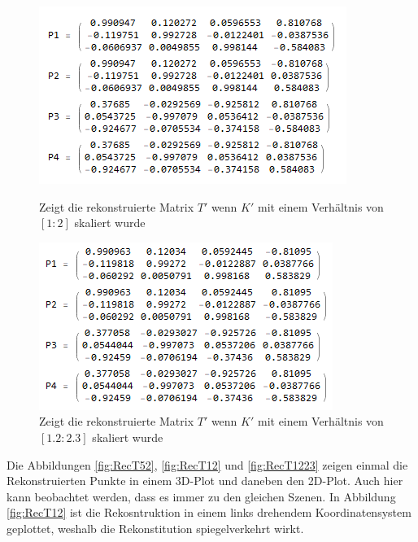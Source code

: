 \begin{figure}[!htb]
	\includegraphics[width=\linewidth]{images/R_12.png}
	\caption[Vier Lösungen für $T$ bei $K'$ mit 1:2]{Zeigt die rekonstruierte Matrix $T'$ wenn $K'$ mit einem Verhältnis von $[1:2]$ skaliert wurde}
	\label{fig:T12}
	\endminipage\hfill
	\includegraphics[width=\linewidth]{images/R_12_23.png}
	\caption[Vier Lösungen für $T$ bei $K'$ mit 1.2 : 2.3]{Zeigt die rekonstruierte Matrix $T'$ wenn $K'$ mit einem Verhältnis von $[1.2:2.3]$ skaliert wurde}
	\label{fig:T1223}
	\endminipage\hfill
\end{figure}
\pagebreak

Die Abbildungen \ref{fig:RecT52}, \ref{fig:RecT12} und \ref{fig:RecT1223} zeigen einmal die Rekonstruierten Punkte in einem 3D-Plot und daneben den 2D-Plot. Auch hier kann beobachtet werden, dass es immer zu den gleichen Szenen. In Abbildung \ref{fig:RecT12} ist die Rekosntruktion in einem links drehendem Koordinatensystem geplottet, weshalb die Rekonstitution spiegelverkehrt wirkt. 


